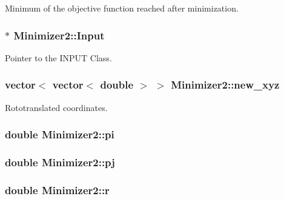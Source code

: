Minimum of the objective function reached after minimization. 

\hypertarget{classMinimizer2_a589bf24b76630588dbd93b78ed85deb4}{
\subsubsection[{Input}]{ $\ast$ {\bf Minimizer2::Input}}}
\label{classMinimizer2_a589bf24b76630588dbd93b78ed85deb4}


Pointer to the INPUT Class. 

\hypertarget{classMinimizer2_a680a201172c6518d60325eaac358b371}{
\subsubsection[{new\_\-xyz}]{\setlength{\rightskip}{0pt plus 5cm}vector$<$ vector$<$ double $>$ $>$ {\bf Minimizer2::new\_\-xyz}}}
\label{classMinimizer2_a680a201172c6518d60325eaac358b371}


Rototranslated coordinates. 

\hypertarget{classMinimizer2_a4ec6faa72ef628c5fb9c860f79e22581}{
\subsubsection[{pi}]{\setlength{\rightskip}{0pt plus 5cm}double {\bf Minimizer2::pi}}}
\label{classMinimizer2_a4ec6faa72ef628c5fb9c860f79e22581}
\hypertarget{classMinimizer2_a2a464eda6d14d97c76ad19d9d713a143}{
\subsubsection[{pj}]{\setlength{\rightskip}{0pt plus 5cm}double {\bf Minimizer2::pj}}}
\label{classMinimizer2_a2a464eda6d14d97c76ad19d9d713a143}
\hypertarget{classMinimizer2_a3f56599cc0464de622f4493ab209be67}{
\subsubsection[{r}]{\setlength{\rightskip}{0pt plus 5cm}double {\bf Minimizer2::r}}}
\label{classMinimizer2_a3f56599cc0464de622f4493ab209be67}


